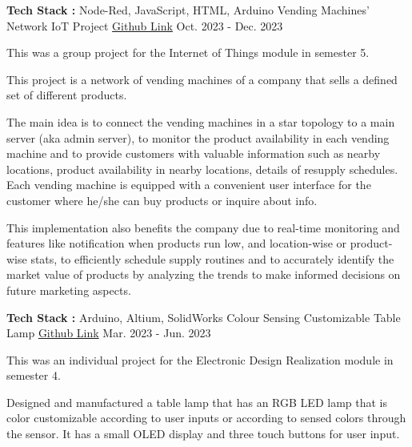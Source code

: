 \begin{cventries}
\cventry
{\textbf{Tech Stack :} Node-Red, JavaScript, HTML, Arduino} %
{Vending Machines' Network IoT Project} %
{\href{https://github.com/VijthanKurrshanth/iot-project-vending-machine-instance}{Github Link}} %
{Oct. 2023 - Dec. 2023} %
{ %
\begin{cvitems}
\item {This was a group project for the Internet of Things module in semester 5.}
\item {This project is a network of vending machines of a company that sells a defined set of different products.}
\item {The main idea is to connect the vending machines in a star topology to a main server (aka admin server),
to monitor the product availability in each vending machine and to provide customers with valuable information such as nearby locations, product availability in nearby locations, details of resupply schedules. Each vending machine is equipped with a convenient user interface for the customer where he/she can buy
products or inquire about info.}
\item {This implementation also benefits the company due to real-time monitoring and features like notification when products run low, and location-wise or product-wise stats, to efficiently schedule supply routines and to accurately identify the market value of products by analyzing the trends to make informed decisions on future marketing aspects.}
\end{cvitems}
}


\cventry
{\textbf{Tech Stack :} Arduino, Altium, SolidWorks} %
{Colour Sensing Customizable Table Lamp} %
{\href{https://github.com/VijthanKurrshanth/Color-Sensing-Lamp-Project/tree/main}{Github Link}} %
{Mar. 2023 - Jun. 2023} %
{ %
\begin{cvitems}
\item {This was an individual project for the Electronic Design Realization module in semester 4.}
\item {Designed and manufactured a table lamp that has an RGB LED lamp that is color customizable according to user inputs or according to sensed colors through the sensor. It has a small OLED display and three touch buttons for user input.}
\end{cvitems}
}


\end{cventries}

